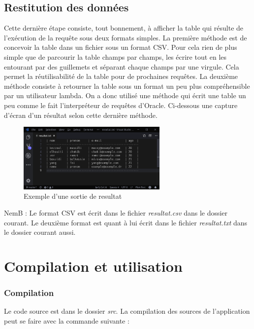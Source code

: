 \documentclass[oneside,13pt,a4paper]{report}
\newcommand\nb[1][0.3]{N\kern-#1emB : }
\begin{document}
\subsection{Restitution des données}

Cette dernière étape consiste, tout bonnement, à afficher la table qui résulte de l'exécution de la requête sous deux formats simples. La première méthode est de concevoir la table dans un fichier sous un format CSV. Pour cela rien de plus simple que de parcourir la table champs par champs, les écrire tout en les entourant par des guillemets et séparant chaque champs par une virgule. Cela permet la réutilisabilité de la table pour de prochaines requêtes. La deuxième méthode consiste à retourner la table sous un format un peu plus compréhensible par un utilisateur lambda. On a donc utilisé une méthode qui écrit une table un peu comme le fait l'interpréteur de requêtes d'Oracle.
 Ci-dessous une capture d'écran d'un résultat selon cette dernière méthode.

\begin{figure}[!h]
	\centering
	\includegraphics[width=0.65\textwidth]{img/sortie.png}
	\caption{Exemple d'une sortie de resultat}
\end{figure}

\nb Le format CSV est écrit dans le fichier \textit{resultat.csv} dans le dossier courant. Le deuxième format est quant à lui écrit dans le fichier \textit{resultat.txt} dans le dossier courant aussi.

\section{Compilation et utilisation}

\subsubsection{Compilation}

Le code source est dans le dossier \textit{src}. La compilation des sources de l'application peut se faire avec la commande suivante :
\end{document}
